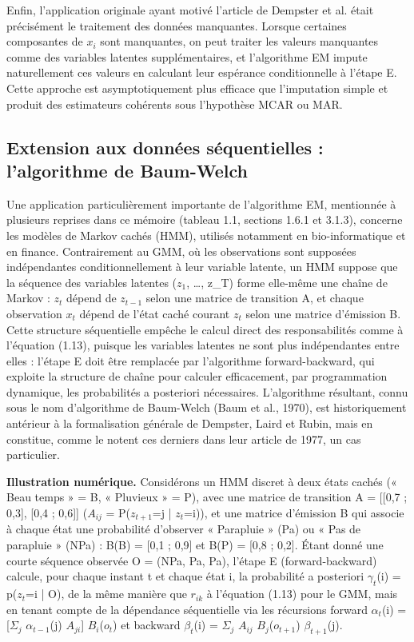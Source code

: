 Enfin, l'application originale ayant motivé l'article de Dempster et al. était précisément le traitement des données manquantes. Lorsque certaines composantes de $x_{i}$ sont manquantes, on peut traiter les valeurs manquantes comme des variables latentes supplémentaires, et l'algorithme EM impute naturellement ces valeurs en calculant leur espérance conditionnelle à l'étape E. Cette approche est asymptotiquement plus efficace que l'imputation simple et produit des estimateurs cohérents sous l'hypothèse MCAR ou MAR.

\subsection{Extension aux données séquentielles : l'algorithme de Baum-Welch}
Une application particulièrement importante de l'algorithme EM, mentionnée à plusieurs reprises dans ce mémoire (tableau 1.1, sections 1.6.1 et 3.1.3), concerne les modèles de Markov cachés (HMM), utilisés notamment en bio-informatique et en finance. Contrairement au GMM, où les observations sont supposées indépendantes conditionnellement à leur variable latente, un HMM suppose que la séquence des variables latentes ($z_{1}$, \ldots{}, z\_T) forme elle-même une chaîne de Markov : $z_{t}$ dépend de $z_{t-1}$ selon une matrice de transition A, et chaque observation $x_{t}$ dépend de l'état caché courant $z_{t}$ selon une matrice d'émission B. Cette structure séquentielle empêche le calcul direct des responsabilités comme à l'équation (1.13), puisque les variables latentes ne sont plus indépendantes entre elles : l'étape E doit être remplacée par l'algorithme forward-backward, qui exploite la structure de chaîne pour calculer efficacement, par programmation dynamique, les probabilités a posteriori nécessaires. L'algorithme résultant, connu sous le nom d'algorithme de Baum-Welch (Baum et al., 1970), est historiquement antérieur à la formalisation générale de Dempster, Laird et Rubin, mais en constitue, comme le notent ces derniers dans leur article de 1977, un cas particulier.

\textbf{Illustration numérique. }Considérons un HMM discret à deux états cachés (« Beau temps » = B, « Pluvieux » = P), avec une matrice de transition A = [[0,7 ; 0,3], [0,4 ; 0,6]] ($A_{ij}$ = P($z_{t+1}$=j | $z_{t}$=i)), et une matrice d'émission B qui associe à chaque état une probabilité d'observer « Parapluie » (Pa) ou « Pas de parapluie » (NPa) : B(B) = [0,1 ; 0,9] et B(P) = [0,8 ; 0,2]. Étant donné une courte séquence observée O = (NPa, Pa, Pa), l'étape E (forward-backward) calcule, pour chaque instant t et chaque état i, la probabilité a posteriori $\gamma _{t}$(i) = p($z_{t}$=i | O), de la même manière que $r_{ik}$ à l'équation (1.13) pour le GMM, mais en tenant compte de la dépendance séquentielle via les récursions forward $\alpha _{t}$(i) = [$\Sigma _{j}$ $\alpha _{t-1}$(j) $A_{ji}$] $B_{i}$($o_{t}$) et backward $\beta _{t}$(i) = $\Sigma _{j}$ $A_{ij}$ $B_{j}$($o_{t+1}$) $\beta _{t+1}$(j).

